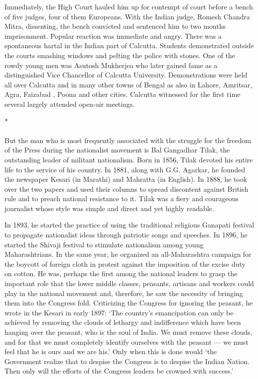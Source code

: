 Immediately, the High Court hauled him up for contempt of court before a bench of five judges, four of them Europeans. With the Indian judge, Romesh Chandra Mitra, dissenting, the bench convicted and sentenced him to two months imprisonment. Popular reaction was immediate and angry. There was a spontaneous hartal in the Indian part of Calcutta. Students demonstrated outside the courts smashing windows and pelting the police with stones. One of the rowdy young men was Asutosh Mukherjea who later gained fame as a distinguished Vice Chancellor of Calcutta University. Demonstrations were held all over Calcutta and in many other towns of Bengal as also in Lahore, Amritsar, Agra, Faizabad , Poona and other cities. Calcutta witnessed for the first time several largely attended open-air meetings.

\begin{center}*\end{center}

\paragraph*{}

But the man who is most frequently associated with the struggle for the freedom of the Press during the nationalist movement is Bal Gangadhar Tilak, the outstanding leader of militant nationalism. Born in 1856, Tilak devoted his entire life to the service of his country. In 1881, along with G.G. Agarkar, he founded the newspaper Kesari (in Marathi) and Mahratta (in English). In 1888, he took over the two papers and used their columns to spread discontent against British rule and to preach national resistance to it. Tilak was a fiery and courageous journalist whose style was simple and direct and yet highly readable.

In 1893, he started the practice of using the traditional religious Ganapati festival to propagate nationalist ideas through patriotic songs and speeches. In 1896, he started the Shivaji festival to stimulate nationalism among young Maharashtrians. In the same year, he organized an all-Maharashtra campaign for the boycott of foreign cloth in protest against the imposition of the excise duty on cotton. He was, perhaps the first among the national leaders to grasp the important role that the lower middle classes, peasants, artisans and workers could play in the national movement and, therefore, he saw the necessity of bringing them into the Congress fold. Criticizing the Congress for ignoring the peasant, he wrote in the Kesari in early 1897: `The country's emancipation can only be achieved by removing the clouds of lethargy and indifference which have been hanging over the peasant, who is the soul of India. We must remove these clouds, and for that we must completely identify ourselves with the peasant --- we must feel that he is ours and we are his.' Only when this is done would `the Government realize that to despise the Congress is to despise the Indian Nation. Then only will the efforts of the Congress leaders be crowned with success.'

